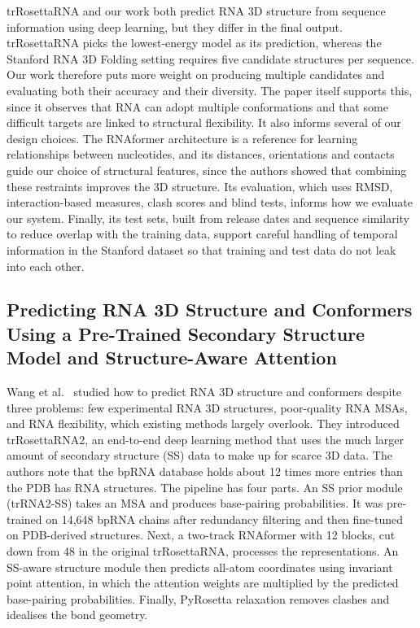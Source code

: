 \documentclass{FastFyp}
\begin{document}
trRosettaRNA and our work both predict RNA 3D structure from sequence information using deep learning, but they differ in the final output. trRosettaRNA picks the lowest-energy model as its prediction, whereas the Stanford RNA 3D Folding setting requires five candidate structures per sequence. Our work therefore puts more weight on producing multiple candidates and evaluating both their accuracy and their diversity. The paper itself supports this, since it observes that RNA can adopt multiple conformations and that some difficult targets are linked to structural flexibility. It also informs several of our design choices. The RNAformer architecture is a reference for learning relationships between nucleotides, and its distances, orientations and contacts guide our choice of structural features, since the authors showed that combining these restraints improves the 3D structure. Its evaluation, which uses RMSD, interaction-based measures, clash scores and blind tests, informs how we evaluate our system. Finally, its test sets, built from release dates and sequence similarity to reduce overlap with the training data, support careful handling of temporal information in the Stanford dataset so that training and test data do not leak into each other.

\subsection{Predicting RNA 3D Structure and Conformers Using a Pre-Trained Secondary Structure Model and Structure-Aware Attention}
Wang et al.~\cite{wang2026trrosettarna2} studied how to predict RNA 3D structure and conformers despite three problems: few experimental RNA 3D structures, poor-quality RNA MSAs, and RNA flexibility, which existing methods largely overlook. They introduced trRosettaRNA2, an end-to-end deep learning method that uses the much larger amount of secondary structure (SS) data to make up for scarce 3D data. The authors note that the bpRNA database holds about 12 times more entries than the PDB has RNA structures. The pipeline has four parts. An SS prior module (trRNA2-SS) takes an MSA and produces base-pairing probabilities. It was pre-trained on 14,648 bpRNA chains after redundancy filtering and then fine-tuned on PDB-derived structures. Next, a two-track RNAformer with 12 blocks, cut down from 48 in the original trRosettaRNA, processes the representations. An SS-aware structure module then predicts all-atom coordinates using invariant point attention, in which the attention weights are multiplied by the predicted base-pairing probabilities. Finally, PyRosetta relaxation removes clashes and idealises the bond geometry.
\end{document}
